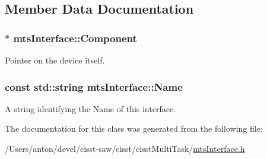 \subsection{Member Data Documentation}
\hypertarget{classmts_interface_a7529d1beb91c4e4786d4c7e377bb91ae}{}
\subsubsection[{Component}]{$\ast$ mts\+Interface\+::\+Component\hspace{0.3cm}{\ttfamily [protected]}}\label{classmts_interface_a7529d1beb91c4e4786d4c7e377bb91ae}
Pointer on the device itself. \hypertarget{classmts_interface_a2c42a04708dfe68848d34bff4a5ee80b}{}
\subsubsection[{Name}]{\setlength{\rightskip}{0pt plus 5cm}const std\+::string mts\+Interface\+::\+Name\hspace{0.3cm}{\ttfamily [protected]}}\label{classmts_interface_a2c42a04708dfe68848d34bff4a5ee80b}
A string identifying the \textquotesingle{}Name\textquotesingle{} of this interface. 

The documentation for this class was generated from the following file\+:\begin{DoxyCompactItemize}
\item 
/\+Users/anton/devel/cisst-\/saw/cisst/cisst\+Multi\+Task/\hyperlink{mts_interface_8h}{mts\+Interface.\+h}\end{DoxyCompactItemize}
